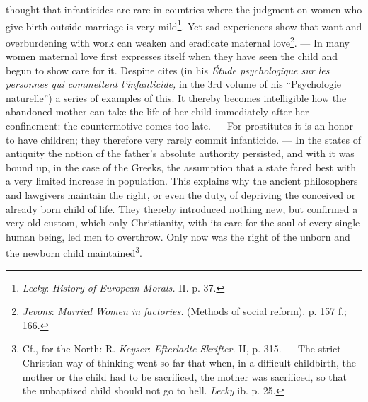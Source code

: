 \documentclass[12pt,a4paper,openany]{book}
\newcommand{\opage}[1]{\marginnote{\footnotesize\textit{[#1]}}}
\begin{document}
thought that infanticides are rare in countries where the judgment on women who give birth outside marriage is very
mild\footnote[2]{\emph{Lecky}: \textit{History of European Morals.} II. p. 37.}. Yet sad experiences show that want and
overburdening with work can weaken and eradicate maternal love\footnote[3]{\emph{Jevons}: \textit{Married Women in
factories.} (Methods of social reform). p. 157 f.; 166.}. --- In many women maternal love first expresses itself when
they have seen the child and begun to show care for it. Despine cites (in his \textit{Étude psychologique sur les
personnes qui commettent l'infanticide,} in the 3rd volume of his ``Psychologie naturelle'') a series of examples of
this. It thereby becomes intelligible how the abandoned mother can take the life of her child immediately after her
confinement: the countermotive comes too late. --- For prostitutes it is an honor to have children; they therefore very
rarely commit infanticide. --- In the states of antiquity the notion of the father's absolute authority persisted, and
with it was bound up, in the case of the Greeks, the assumption that a state fared best with a very limited increase in
population. This explains why the ancient philosophers and lawgivers maintain the right, or even the duty, of depriving
the conceived or already born child of life. They thereby introduced nothing new, but confirmed a very old
\opage{328}custom, which only Christianity, with its care for the soul of every single human being, led men to
overthrow. Only now was the right of the unborn and the newborn child maintained\footnote[1]{Cf., for the North: R.
\emph{Keyser}: \textit{Efterladte Skrifter.} II, p. 315. --- The strict Christian way of thinking went so far that when,
in a difficult childbirth, the mother or the child had to be sacrificed, the mother was sacrificed, so that the
unbaptized child should not go to hell. \emph{Lecky} ib. p. 25.}.
\end{document}
